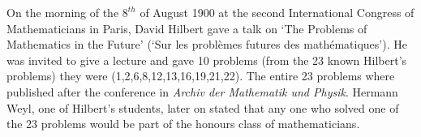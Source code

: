 \documentclass[12pt]{article}
\begin{document}

On the morning of the $8^{th}$ of August 1900 at the second International Congress of Mathematicians in Paris, David Hilbert 
gave a talk on `The Problems of Mathematics in the Future' (`Sur les probl\`emes futures des math\'ematiques').\cite{GGI}  He was invited to give a lecture and
gave 10 problems (from the 23 known Hilbert's problems) they were (1,2,6,8,12,13,16,19,21,22).\cite{GGI}  The entire 23 problems where published after the conference in \emph{Archiv der Mathematik und Physik}.
Hermann Weyl, one of Hilbert's students, later on stated that any one who solved one of the 23 problems
would be part of the honours class of mathematicians.\cite{GJ} 
\end{document}

